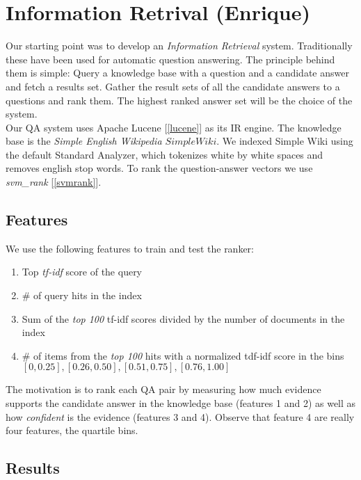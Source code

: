 \section{Information Retrival (Enrique)}
Our starting point was to develop an \emph{Information Retrieval} system. Traditionally these have been used for automatic question answering. The principle behind them is simple: Query a knowledge base with a question and a candidate answer and fetch a results set.  Gather the result sets of all the candidate answers to a questions and rank them. The highest ranked answer set will be the choice of the system.\\

Our QA system uses Apache Lucene [\ref{lucene}] as its IR engine. The knowledge base is the \emph{Simple English Wikipedia \(Simple Wiki\)}. We indexed Simple Wiki using the default Standard Analyzer, which tokenizes white by white spaces and removes english stop words. To rank the question-answer vectors we use \emph{svm\_rank} [\ref{svmrank}].

\subsection{Features}

We use the following features to train and test the ranker:

\begin{enumerate}
\item Top \emph{tf-idf} score of the query
\item \# of query hits in the index
\item Sum of the \emph{top 100} tf-idf scores divided by the number of documents in the index
\item \# of items from the \emph{top 100} hits with a normalized tdf-idf score in the bins $[0, 0.25], [0.26, 0.50], [0.51, 0.75],  [0.76, 1.00]$
\end{enumerate}

The motivation is to rank each QA pair by measuring how much evidence supports the candidate answer in the knowledge base (features 1 and 2) as well as how \emph{confident} is the evidence (features 3 and 4). Observe that feature 4 are really four features, the quartile bins.\\

\subsection{Results}


